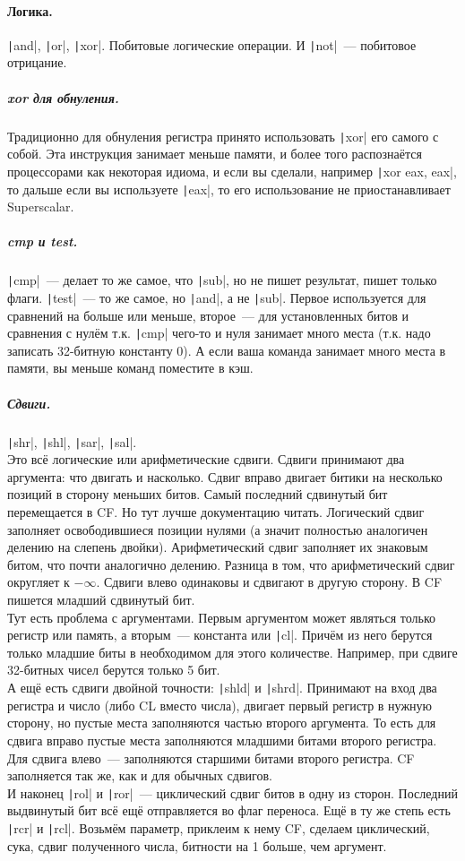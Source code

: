 \documentclass{article}
\begin{document}
    \paragraph{Логика.}
    \texttt|and|, \texttt|or|, \texttt|xor|. Побитовые логические операции. И \texttt|not|~--- побитовое отрицание.
    \subparagraph{xor для обнуления.}
    Традиционно для обнуления регистра принято использовать \texttt|xor| его самого с собой. Эта инструкция занимает меньше памяти, и более того распознаётся процессорами как некоторая идиома, и если вы сделали, например \texttt|xor eax, eax|, то дальше если вы используете \texttt|eax|, то его использование не приостанавливает Superscalar.
    \subparagraph{cmp и test.}
    \texttt|cmp|~--- делает то же самое, что \texttt|sub|, но не пишет результат, пишет только флаги. \texttt|test|~--- то же самое, но \texttt|and|, а не \texttt|sub|. Первое используется для сравнений на больше или меньше, второе~--- для установленных битов и сравнения с нулём т.к. \texttt|cmp| чего-то и нуля занимает много места (т.к. надо записать 32-битную константу 0). А если ваша команда занимает много места в памяти, вы меньше команд поместите в кэш.
    \subparagraph{Сдвиги.}
    \texttt|shr|, \texttt|shl|, \texttt|sar|, \texttt|sal|.\\
    Это всё логические или арифметические сдвиги. Сдвиги принимают два аргумента: что двигать и насколько. Сдвиг вправо двигает битики на несколько позиций в сторону меньших битов. Самый последний сдвинутый бит перемещается в CF. Но тут лучше документацию читать. Логический сдвиг заполняет освободившиеся позиции нулями (а значит полностью аналогичен делению на слепень двойки). Арифметический сдвиг заполняет их знаковым битом, что почти аналогично делению. Разница в том, что арифметический сдвиг округляет к $-\infty$. Сдвиги влево одинаковы и сдвигают в другую сторону. В CF пишется младший сдвинутый бит.\\
    Тут есть проблема с аргументами. Первым аргументом может являться только регистр или память, а вторым~--- константа или \texttt|cl|. Причём из него берутся только младшие биты в необходимом для этого количестве. Например, при сдвиге 32-битных чисел берутся только 5 бит.\\
    А ещё есть сдвиги двойной точности: \texttt|shld| и \texttt|shrd|. Принимают на вход два регистра и число (либо CL вместо числа), двигает первый регистр в нужную сторону, но пустые места заполняются частью второго аргумента. То есть для сдвига вправо пустые места заполняются младшими битами второго регистра. Для сдвига влево~--- заполняются старшими битами второго регистра. CF заполняется так же, как и для обычных сдвигов.\\
    И наконец \texttt|rol| и \texttt|ror|~--- циклический сдвиг битов в одну из сторон. Последний выдвинутый бит всё ещё отправляется во флаг переноса. Ещё в ту же степь есть \texttt|rcr| и \texttt|rcl|. Возьмём параметр, приклеим к нему CF, сделаем циклический, сука, сдвиг полученного числа, битности на 1 больше, чем аргумент.
\end{document}
